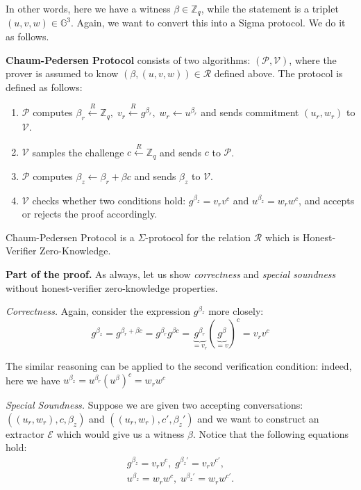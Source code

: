 \documentclass[../lecture-notes.tex]{subfiles}
\begin{document}
In other words, here we have a witness $\beta \in \mathbb{Z}_q$, while the statement is a triplet $(u,v,w) \in \mathbb{G}^3$. Again, we want to convert this into a Sigma protocol. We do it as follows.

\begin{definition}
    \textbf{Chaum-Pedersen Protocol} consists of two algorithms: $(\mathcal{P}, \mathcal{V})$, where the prover is assumed to know $(\beta,(u,v,w)) \in \mathcal{R}$ defined above. The protocol is defined as follows:
    \begin{enumerate}
        \item $\mathcal{P}$ computes $\beta_r \xleftarrow{R} \mathbb{Z}_q, \; v_r \xleftarrow{R} g^{\beta_r}, \; w_r \gets u^{\beta_r}$ and sends commitment $(u_r,w_r)$ to $\mathcal{V}$.
        \item $\mathcal{V}$ samples the challenge $c \xleftarrow{R} \mathbb{Z}_q$ and sends $c$ to $\mathcal{P}$.
        \item $\mathcal{P}$ computes $\beta_z \gets \beta_r + \beta c$ and sends $\beta_z$ to $\mathcal{V}$.
        \item $\mathcal{V}$ checks whether two conditions hold: $g^{\beta_z} = v_rv^c$ and $u^{\beta_z} = w_r w^c$, and accepts or rejects the proof accordingly.
    \end{enumerate}
\end{definition}

\begin{theorem}
    Chaum-Pedersen Protocol is a $\Sigma$-protocol for the relation $\mathcal{R}$ which is Honest-Verifier Zero-Knowledge.
\end{theorem}

\textbf{Part of the proof.} As always, let us show \textit{correctness} and \textit{special soundness} without honest-verifier zero-knowledge properties.

\textit{Correctness.} Again, consider the expression $g^{\beta_z}$ more closely:
\begin{equation*}
    g^{\beta_z} = g^{\beta_r + \beta c} = g^{\beta_r}g^{\beta c} = \underbrace{g^{\beta_r}}_{=v_r}(\underbrace{g^{\beta}}_{=v})^c = v_rv^c
\end{equation*}

The similar reasoning can be applied to the second verification condition: indeed, here we have $u^{\beta_z} = u^{\beta_r}(u^{\beta})^c = w_rw^c$

\textit{Special Soundness.} Suppose we are given two accepting conversations: $((u_r,w_r),c,\beta_z)$ and $((u_r,w_r),c',\beta_z')$ and we want to construct an extractor $\mathcal{E}$ which would give us a witness $\beta$. Notice that the following equations hold:
\begin{align*}
    g^{\beta_z} = v_rv^c, \; g^{\beta_z'} = v_rv^{c'}, \\ u^{\beta_z} = w_rw^c, \; u^{\beta_z'} = w_rw^{c'}.
\end{align*}
\end{document}
